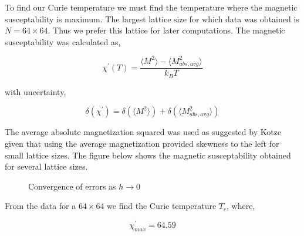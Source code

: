 \documentclass{article}
\begin{document}
To find our Curie temperature we must find the temperature where the magnetic susceptability is maximum. The largest lattice
size for which data was obtained is $N = 64 \times 64$. Thus we prefer this lattice for later computations. The magnetic susceptability was calculated as,

\begin{equation} \label{eq:mag_susc}
  \chi^{\prime}(T) = \frac{\langle{M^2}\rangle - \langle{M_{abs, avg}^2}\rangle}{k_{B}T}
\end{equation}

with uncertainty,

\begin{equation} \label{eq:mag_susc_uncert}
  \delta(\chi^{\prime}) = \delta(\langle{M^2}\rangle) + \delta(\langle{M_{abs, avg}^2}\rangle)
\end{equation}

The average absolute magnetization squared was used as suggested by Kotze given that using the average magnetization provided skewness
to the left for small lattice sizes. The figure below shows the magnetic susceptability obtained for several lattice sizes.

\begin{figure}[H]
  \begin{center}
  \end{center}
  \caption{Convergence of errors as $h\to 0$}
  \label{fig:mag_susc}
\end{figure}

From the data for a $64 \times 64$ we find the Curie temperature $T_{c}$, where,

\begin{equation} \label{eq:mag_susc_uncert}
  \chi_{max}^{\prime} = 64.59
\end{equation}
\end{document}
